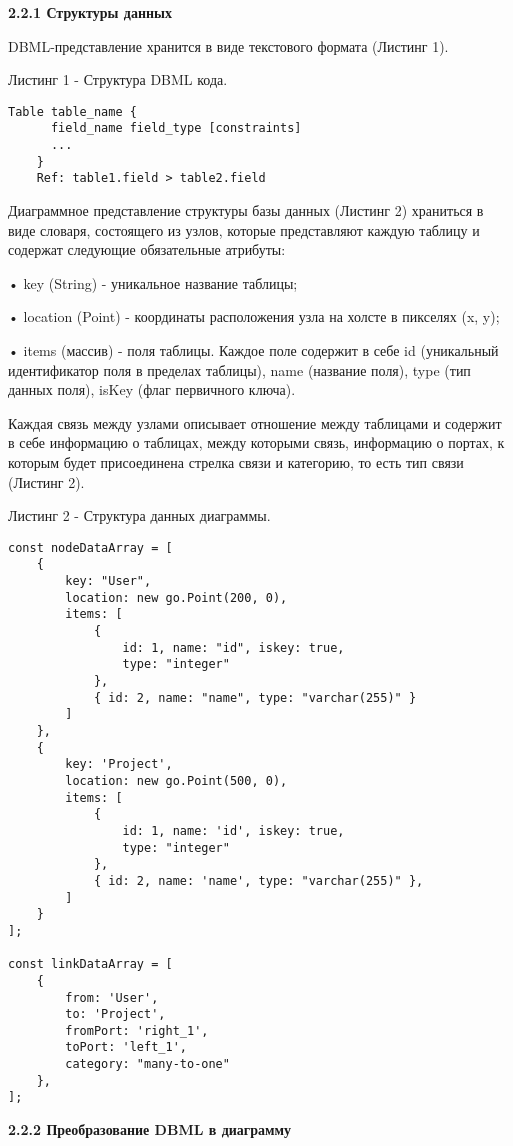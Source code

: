 \textbf{2.2.1 Структуры данных}

DBML-представление хранится в виде текстового формата (Листинг 1).

Листинг 1 - Структура DBML кода.
\begin{lstlisting}[frame=single]
    Table table_name {
      field_name field_type [constraints]
      ...
    }
    Ref: table1.field > table2.field
\end{lstlisting}

Диаграммное представление структуры базы данных (Листинг 2) храниться в виде словаря, состоящего из узлов, которые представляют каждую таблицу  и содержат следующие обязательные атрибуты:

• key (String) - уникальное название таблицы;

• location (Point) - координаты расположения узла на холсте в пикселях (x, y);

• items (массив) - поля таблицы. Каждое поле содержит в себе id (уникальный идентификатор поля в пределах таблицы), name (название поля), type (тип данных поля), isKey (флаг первичного ключа). 

Каждая связь между узлами описывает отношение между таблицами и содержит в себе информацию о таблицах, между которыми связь, информацию о портах, к которым будет присоединена стрелка связи и категорию, то есть тип связи (Листинг 2). 

Листинг 2 - Структура данных диаграммы.
\begin{lstlisting}[frame=single]
const nodeDataArray = [
    {
        key: "User",
        location: new go.Point(200, 0),
        items: [
            {
                id: 1, name: "id", iskey: true,
                type: "integer"
            },
            { id: 2, name: "name", type: "varchar(255)" }
        ]
    },
    {
        key: 'Project',
        location: new go.Point(500, 0),
        items: [
            {
                id: 1, name: 'id', iskey: true,
                type: "integer"
            },
            { id: 2, name: 'name', type: "varchar(255)" },
        ]
    }
];

const linkDataArray = [
    {
        from: 'User',
        to: 'Project',
        fromPort: 'right_1',
        toPort: 'left_1',
        category: "many-to-one"
    },
];
\end{lstlisting}


\textbf{2.2.2 Преобразование DBML в диаграмму}

